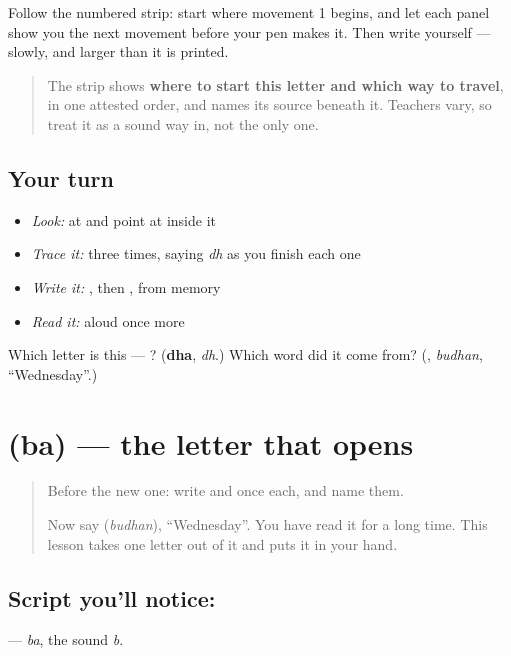 Follow the numbered strip: start where movement 1 begins, and let each panel show you the next movement before your pen makes it. Then write  yourself — slowly, and larger than it is printed.

\begin{quote}
The strip shows \textbf{where to start this letter and which way to travel}, in one attested order, and names its source beneath it. Teachers vary, so treat it as a sound way in, not the only one.
\end{quote}

\subsection*{Your turn}
\begin{itemize}
\raggedright
  \item \emph{Look:} at \textbf{} and point at  inside it
  \item \emph{Trace it:}  three times, saying \emph{dh} as you finish each one
  \item \emph{Write it:} , then , from memory
  \item \emph{Read it:} \textbf{} aloud once more
\end{itemize}

\begin{tcolorbox}[breakable,colback=teal!4,colframe=teal!35!black,title={Before you move on}]
Which letter is this — ? (\textbf{dha}, \emph{dh}.) Which word did it come from? (\textbf{}, \emph{budhan}, \textquotedblleft{}Wednesday\textquotedblright{}.)
\end{tcolorbox}
\section[\texorpdfstring{\ml{ബ} (ba)}{ബ (ba)}]{ (ba) — the letter that opens }

\label{lesson:ML-W114-ba}



\begin{quote}
Before the new one: write  and  once each, and name them.

Now say \textbf{} (\emph{budhan}), \textquotedblleft{}Wednesday\textquotedblright{}. You have read it for a long time. This lesson takes one letter out of it and puts it in your hand.
\end{quote}

\subsection*{Script you'll notice: }
\textbf{} — \emph{ba}, the sound \emph{b}.

